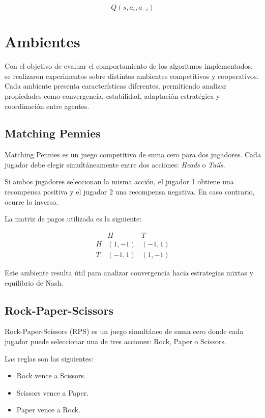 \documentclass[letterpaper,12pt]{article} %
\begin{document}
\[
Q(s,a_i,a_{-i})
\]

\section{Ambientes}

Con el objetivo de evaluar el comportamiento de los algoritmos implementados, se realizaron experimentos sobre distintos ambientes competitivos y cooperativos. Cada ambiente presenta características diferentes, permitiendo analizar propiedades como convergencia, estabilidad, adaptación estratégica y coordinación entre agentes.

\subsection{Matching Pennies}

Matching Pennies es un juego competitivo de suma cero para dos jugadores. Cada jugador debe elegir simultáneamente entre dos acciones: \textit{Heads} o \textit{Tails}.

Si ambos jugadores seleccionan la misma acción, el jugador 1 obtiene una recompensa positiva y el jugador 2 una recompensa negativa. En caso contrario, ocurre lo inverso.

La matriz de pagos utilizada es la siguiente:

\[
\begin{array}{c|cc}
 & H & T \\
\hline
H & (1,-1) & (-1,1) \\
T & (-1,1) & (1,-1)
\end{array}
\]

Este ambiente resulta útil para analizar convergencia hacia estrategias mixtas y equilibrio de Nash.


\subsection{Rock-Paper-Scissors}

Rock-Paper-Scissors (RPS) es un juego simultáneo de suma cero donde cada jugador puede seleccionar una de tres acciones: Rock, Paper o Scissors.

Las reglas son las siguientes:

\begin{itemize}
    \item Rock vence a Scissors.
    \item Scissors vence a Paper.
    \item Paper vence a Rock.
\end{itemize}
\end{document}
